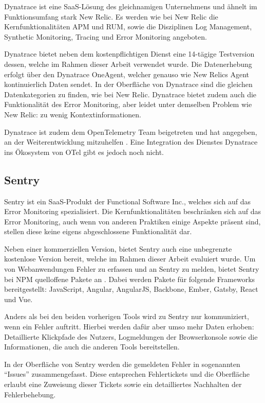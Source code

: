 Dynatrace \cite{Dynatrace} ist eine SaaS-Lösung des gleichnamigen Unternehmens und ähnelt im Funktionsumfang stark New Relic. Es werden wie bei New Relic die Kernfunktionalitäten APM und RUM, sowie die Disziplinen Log Management, Synthetic Monitoring, Tracing und Error Monitoring angeboten.

Dynatrace bietet neben dem kostenpflichtigen Dienst eine 14-tägige Testversion dessen, welche im Rahmen dieser Arbeit verwendet wurde. Die Datenerhebung erfolgt über den Dynatrace OneAgent, welcher genauso wie New Relics Agent kontinuierlich Daten sendet. In der Oberfläche von Dynatrace sind die gleichen Datenkategorien zu finden, wie bei New Relic. Dynatrace bietet zudem auch die Funktionalität des Error Monitoring, aber leidet unter demselben Problem wie New Relic: zu wenig Kontextinformationen.

Dynatrace ist zudem dem OpenTelemetry Team beigetreten und hat angegeben, an der Weiterentwicklung mitzuhelfen \cite{DynatraceJoinOTelProject}. Eine Integration des Dienstes Dynatrace ins Ökosystem von OTel gibt es jedoch noch nicht.

\subsection{Sentry}

Sentry \cite{Sentry} ist ein SaaS-Produkt der Functional Software Inc., welches sich auf das Error Monitoring spezialisiert. Die Kernfunktionalitäten beschränken sich auf das Error Monitoring, auch wenn von anderen Praktiken einige Aspekte präsent sind, stellen diese keine eigens abgeschlossene Funktionalität dar.

Neben einer kommerziellen Version, bietet Sentry auch eine unbegrenzte kostenlose Version bereit, welche im Rahmen dieser Arbeit evaluiert wurde. Um von Webanwendungen Fehler zu erfassen und an Sentry zu melden, bietet Sentry bei NPM quelloffene Pakete an \cite{SentryJSGithub}. Dabei werden Pakete für folgende Frameworks bereitgestellt: JavaScript, Angular, AngularJS, Backbone, Ember, Gatsby, React und Vue.

Anders als bei den beiden vorherigen Tools wird zu Sentry nur kommuniziert, wenn ein Fehler auftritt. Hierbei werden dafür aber umso mehr Daten erhoben: Detaillierte Klickpfade des Nutzers, Logmeldungen der Browserkonsole sowie die Informationen, die auch die anderen Tools bereitstellen.

In der Oberfläche von Sentry werden die gemeldeten Fehler in sogenannten \enquote{Issues} zusammengefasst. Diese entsprechen Fehlertickets und die Oberfläche erlaubt eine Zuweisung dieser Tickets sowie ein detailliertes Nachhalten der Fehlerbehebung.

